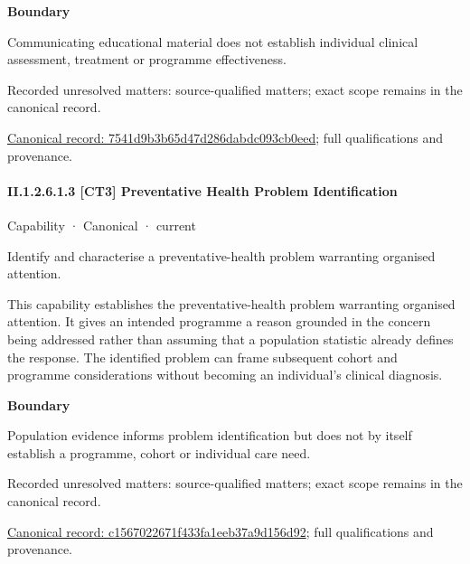 \textbf{Boundary}



Communicating educational material does not establish individual clinical assessment, treatment or programme effectiveness.


{\small Recorded unresolved matters: source-qualified matters; exact scope remains in the canonical record.}\par
{\footnotesize \href{../../../../continuum/strategy/capability/7541d9b3b65d47d286dabdc093cb0eed.md}{Canonical record: 7541d9b3b65d47d286dabdc093cb0eed}; full qualifications and provenance.}\par
\paragraph*{II.1.2.6.1.3 [CT3] Preventative Health Problem Identification}
\label{navigation:II.1.2.6.1.3}

\label{element:c1567022671f433fa1eeb37a9d156d92}
{\small Capability · Canonical · current}\par

Identify and characterise a preventative-health problem warranting organised attention.



This capability establishes the preventative-health problem warranting organised attention. It gives an intended programme a reason grounded in the concern being addressed rather than assuming that a population statistic already defines the response. The identified problem can frame subsequent cohort and programme considerations without becoming an individual's clinical diagnosis.



\textbf{Boundary}



Population evidence informs problem identification but does not by itself establish a programme, cohort or individual care need.


{\small Recorded unresolved matters: source-qualified matters; exact scope remains in the canonical record.}\par
{\footnotesize \href{../../../../continuum/strategy/capability/c1567022671f433fa1eeb37a9d156d92.md}{Canonical record: c1567022671f433fa1eeb37a9d156d92}; full qualifications and provenance.}\par
